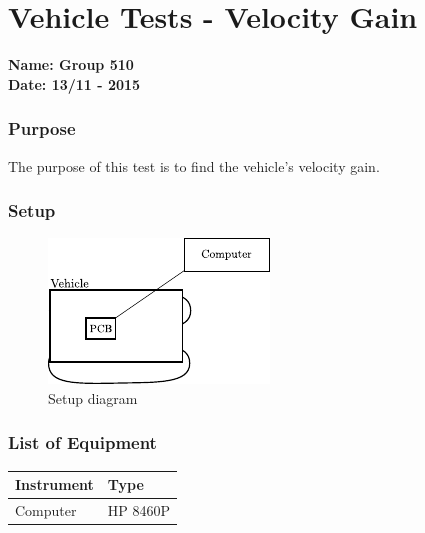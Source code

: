 \pagebreak
\section{Vehicle Tests - Velocity Gain}\label{app:gainTest}
\textbf{Name: Group 510}\\
\textbf{Date: 13/11 - 2015}

\subsubsection{Purpose}
The purpose of this test is to find the vehicle's velocity gain.

\subsubsection{Setup}

\begin{figure}[H]
	\centering
	\includegraphics[scale=1.6]{figures/inertiaTestSetupDiagram2.pdf}
	\caption{Setup diagram}
	\label{GainAndTimeTestSetupDiagram}
\end{figure}\vspace{-5mm}

\subsubsection{List of Equipment}

\begin{table}[H]
\begin{tabular}{|p{10cm}|p{4cm}|}
\hline%
  \textbf{Instrument}                     &  \textbf{Type}       \\
\hline%
  Computer                                &  HP 8460P    \\
\hline %
\end{tabular}
\end{table}

